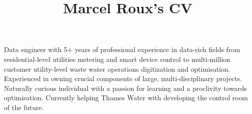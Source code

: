 \documentclass[a4paper,online,extended]{adcv}
\title{Marcel Roux's CV}
\newcommand*{\unistb}{Stellenbosch University}
\begin{document}

Data engineer with 5+ years of professional experience in data-rich fields from residential-level utilities metering and smart device control to multi-million customer utility-level waste water operations digitization and optimisation. Experienced in owning crucial components of large, multi-disciplinary projects. Naturally curious individual with a passion for learning and a proclivity towards optimisation. Currently helping Thames Water with developing the control room of the future.








\end{document}
